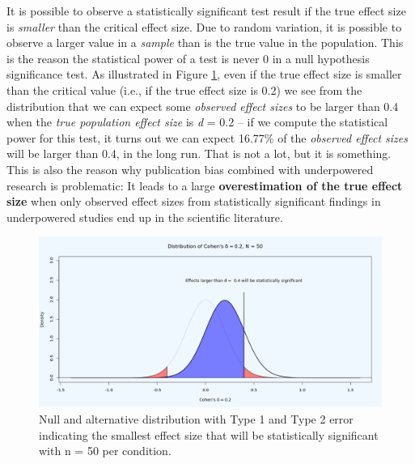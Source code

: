 \documentclass[
  oneside]{krantz}
\begin{document}
It is possible to observe a statistically significant test result if the true effect size is \emph{smaller} than the critical effect size. Due to random variation, it is possible to observe a larger value in a \emph{sample} than is the true value in the population. This is the reason the statistical power of a test is never 0 in a null hypothesis significance test. As illustrated in Figure \ref{fig:distpowerplot2}, even if the true effect size is smaller than the critical value (i.e., if the true effect size is 0.2) we see from the distribution that we can expect some \emph{observed effect sizes} to be larger than 0.4 when the \emph{true population effect size} is \emph{d} = 0.2 -- if we compute the statistical power for this test, it turns out we can expect 16.77\% of the \emph{observed effect sizes} will be larger than 0.4, in the long run. That is not a lot, but it is something. This is also the reason why publication bias combined with underpowered research is problematic: It leads to a large \textbf{overestimation of the true effect size} when only observed effect sizes from statistically significant findings in underpowered studies end up in the scientific literature.



\begin{figure}

{\centering \includegraphics[width=1\linewidth]{images/dpplot502} 

}

\caption{Null and alternative distribution with Type 1 and Type 2 error indicating the smallest effect size that will be statistically significant with n = 50 per condition.}\label{fig:distpowerplot2}
\end{figure}
\end{document}
